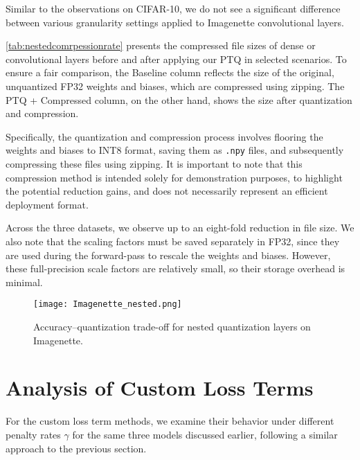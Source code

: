 Similar to the observations on CIFAR-10, we do not see a significant difference between various granularity settings applied to Imagenette convolutional layers.


\cref{tab:nestedcomrpessionrate} presents the compressed file sizes of dense or convolutional layers before and after applying our PTQ in selected scenarios. 
To ensure a fair comparison, the Baseline column reflects the size of the original, unquantized FP32 weights and biases, which are compressed using zipping. 
The PTQ + Compressed column, on the other hand, shows the size after quantization and compression.

Specifically, the quantization and compression process involves flooring the weights and biases to
INT8 format, saving them as \texttt{.npy} files, and subsequently compressing these files using zipping. 
It is important to note that this compression method is intended solely for demonstration purposes, 
to highlight the potential reduction gains, and does not necessarily represent an efficient deployment format.

Across the three datasets, we observe up to an eight-fold reduction in file size.
We also note that the scaling factors must be saved separately in FP32, 
since they are used during the forward-pass to rescale the weights and biases. 
However, these full-precision scale factors are relatively small, so their storage overhead is minimal.


\begin{figure}[t!]
  \centering
  \texttt{[image: Imagenette\_nested.png]}
  \caption{Accuracy–quantization trade-off for nested quantization layers on Imagenette.}
  \label{fig:imagenette-nested}
\end{figure}


\newpage

\section{Analysis of Custom Loss Terms}
\label{sec:analysisofcustomlossfunctionterms}

\hspace*{1em}For the custom loss term methods, we examine their behavior under different
penalty rates \( \gamma \) for the same three models discussed earlier, 
following a similar approach to the previous section.

